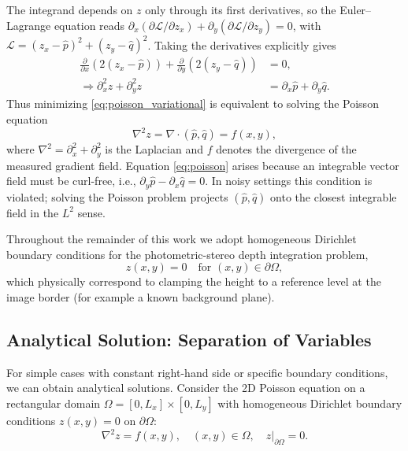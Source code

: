 \documentclass[11pt]{article}
\begin{document}
The integrand depends on $z$ only through its first derivatives, so the Euler--Lagrange equation reads $\partial_x (\partial \mathcal{L}/\partial z_x)+\partial_y(\partial \mathcal{L}/\partial z_y)=0$, with $\mathcal{L}=(z_x-\hat{p})^2+(z_y-\hat{q})^2$. Taking the derivatives explicitly gives
\begin{align}
\frac{\partial}{\partial x} \left(2(z_x-\hat{p})\right) + \frac{\partial}{\partial y} \left(2(z_y-\hat{q})\right) &= 0, \\
\Rightarrow \partial_x^2 z + \partial_y^2 z &= \partial_x \hat{p} + \partial_y \hat{q}.
\end{align}
Thus minimizing \eqref{eq:poisson_variational} is equivalent to solving the Poisson equation
\begin{equation}\label{eq:poisson}
\nabla^2 z = \nabla\cdot(\hat{p},\hat{q}) = f(x,y),
\end{equation}
where $\nabla^2 = \partial_x^2 + \partial_y^2$ is the Laplacian and $f$ denotes the divergence of the measured gradient field. Equation \eqref{eq:poisson} arises because an integrable vector field must be curl-free, i.e., $\partial_y \hat{p} - \partial_x \hat{q}=0$. In noisy settings this condition is violated; solving the Poisson problem projects $(\hat{p},\hat{q})$ onto the closest integrable field in the $L^2$ sense.

Throughout the remainder of this work we adopt homogeneous Dirichlet boundary conditions for the photometric-stereo depth integration problem,
\begin{equation}
z(x,y) = 0 \quad \text{for } (x,y)\in\partial\Omega,
\end{equation}
which physically correspond to clamping the height to a reference level at the image border (for example a known background plane).

\subsection{Analytical Solution: Separation of Variables}

For simple cases with constant right-hand side or specific boundary conditions, we can obtain analytical solutions. 
Consider the 2D Poisson equation on a rectangular domain $\Omega = [0, L_x] \times [0, L_y]$ with homogeneous Dirichlet boundary conditions $z(x,y) = 0$ on $\partial \Omega$:
\begin{equation}
\nabla^2 z = f(x,y), \quad (x,y) \in \Omega, \quad z|_{\partial \Omega} = 0.
\end{equation}
\end{document}
